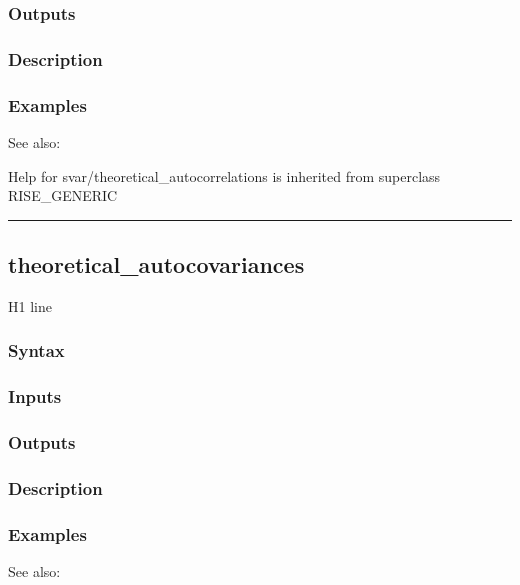 \documentclass[letterpaper,10pt,english]{sphinxmanual}
\begin{document}
\subsubsection{Outputs}
\label{classes/models/@svar/svar:id142}

\subsubsection{Description}
\label{classes/models/@svar/svar:id143}

\subsubsection{Examples}
\label{classes/models/@svar/svar:id144}
See also:

Help for svar/theoretical\_autocorrelations is inherited from superclass RISE\_GENERIC


\bigskip\hrule{}\bigskip



\subsection{theoretical\_autocovariances}
\label{classes/models/@svar/svar:id145}\label{classes/models/@svar/svar:theoretical-autocovariances}
H1 line


\subsubsection{Syntax}
\label{classes/models/@svar/svar:id146}

\subsubsection{Inputs}
\label{classes/models/@svar/svar:id147}

\subsubsection{Outputs}
\label{classes/models/@svar/svar:id148}

\subsubsection{Description}
\label{classes/models/@svar/svar:id149}

\subsubsection{Examples}
\label{classes/models/@svar/svar:id150}
See also:
\end{document}
